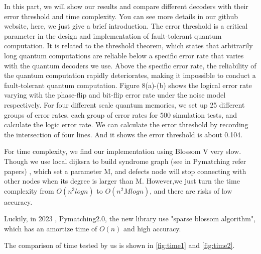\documentclass[
    a4paper, %
    10pt, %
    unnumberedsections, %
    twoside, %
]{LTJournalArticle}
\begin{document}
    In this part, we will show our results and compare different decoders with their error threshold and time complexity. You can see more details in our github website, here, we just give a brief introduction.
    The error threshold is a critical parameter in the design and implementation of fault-tolerant quantum computation. It is related to the threshold theorem, which states that arbitrarily long quantum computations are reliable below a specific error rate that varies with the quantum decoders we use. Above the specific error rate, the reliability of the quantum computation rapidly deteriorates, making it impossible to conduct a fault-tolerant quantum computation.
    Figure 8(a)-(b) shows the logical error rate varying with the phase-flip and bit-flip error rate under the noise model respectively. For four different scale quantum memories, we set up 25 different groups of error rates, each group of error rates for 500 simulation tests, and calculate the logic error rate. We can calculate the error threshold by recording the intersection of four lines. And it shows the error threshold is about 0.104. 
    

    For time complexity, we find our implementation using Blossom V very slow.
    Though we use local dijksra to build syndrome graph (see in Pymatching refer papers) ,
    which set a parameter M, and defects node will stop connecting with other nodes when its degree is larger than M.
    However,we just turn the time complexity from $O(n^3logn)$ \cite{12} to $O(n^2Mlogn)$, and there are risks of low accuracy.

    Luckily, in 2023 , Pymatching2.0, the new library use "sparse blossom algorithm", which has an amortize time of $O(n)$ and high accuracy.

    The comparison of time tested by us is shown in \ref{fig:time1} and \ref{fig:time2}. 
    
\end{document}

